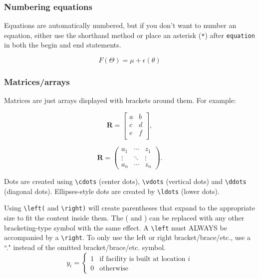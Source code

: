 \documentclass[12pt]{article}
\begin{document}
\subsubsection{Numbering equations}
Equations are automatically numbered, but if you don't want to number an equation, either use the shorthand method or place an asterisk (\texttt{*}) after \texttt{equation} in both the begin and end statements.

\begin{equation*} 
F(\Theta) = \mu + \epsilon(\theta)
\end{equation*}


\subsubsection{Matrices/arrays}
Matrices are just arrays displayed with brackets around them. For example:

\begin{equation}
\mathbf{R} = \left[ 
\begin{array}{cc}
a & b  \\
c & d  \\
e & f  \\
\end{array} 
\right], 
\end{equation}

\begin{equation}
\mathbf{R} = \left( 
\begin{array}{ccc}
a_1 & \cdots & z_1 \\
\vdots & \ddots & \vdots \\
a_n & \cdots & z_n
\end{array} 
\right). 
\end{equation}

Dots are created using \verb!\cdots! (center dots), \verb!\vdots! (vertical dots) and \verb!\ddots! (diagonal dots). Ellipses-style dots are created by \verb!\ldots! (lower dots).

Using \verb!\left(! and \verb!\right)! will create parentheses that expand to the appropriate size to fit the content inside them. The ( and ) can be replaced with any other bracketing-type symbol with the same effect. A \verb!\left! must ALWAYS be accompanied by a  \verb!\right!. To only use the left or right bracket/brace/etc., use a ``." instead of the omitted bracket/brace/etc. symbol.
\begin{equation*}
y_i = \left\{ \begin{array}{ll}
1 & \mbox{if facility is built at location } i \\
0 & \mbox{otherwise}
\end{array} \right.
\end{equation*}
\end{document}

